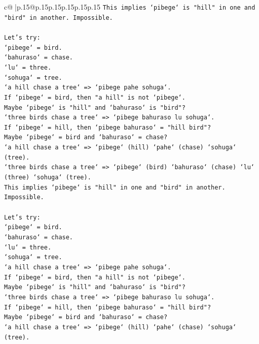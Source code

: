 \documentclass{article}
\begin{document}
{\begin{supertabular}{c@{$\;$}|p{.15\linewidth}@{}p{.15\linewidth}p{.15\linewidth}p{.15\linewidth}p{.15\linewidth}p{.15\linewidth}}
{{{\texttt{This implies `pibege` is "hill" in one and "bird" in another. Impossible.} \\
\\ 
\texttt{Let's try:} \\
\texttt{`pibege` = bird.} \\
\texttt{`bahuraso` = chase.} \\
\texttt{`lu` = three.} \\
\texttt{`sohuga` = tree.} \\
\texttt{`a hill chase a tree` => `pibege pahe sohuga`.} \\
\texttt{If `pibege` = bird, then "a hill" is not `pibege`.} \\
\texttt{Maybe `pibege` is "hill" and `bahuraso` is "bird"?} \\
\texttt{`three birds chase a tree` => `pibege bahuraso lu sohuga`.} \\
\texttt{If `pibege` = hill, then `pibege bahuraso` = "hill bird"?} \\
\texttt{Maybe `pibege` = bird and `bahuraso` = chase?} \\
\texttt{`a hill chase a tree` => `pibege` (hill) `pahe` (chase) `sohuga` (tree).} \\
\texttt{`three birds chase a tree` => `pibege` (bird) `bahuraso` (chase) `lu` (three) `sohuga` (tree).} \\
\texttt{This implies `pibege` is "hill" in one and "bird" in another. Impossible.} \\
\\ 
\texttt{Let's try:} \\
\texttt{`pibege` = bird.} \\
\texttt{`bahuraso` = chase.} \\
\texttt{`lu` = three.} \\
\texttt{`sohuga` = tree.} \\
\texttt{`a hill chase a tree` => `pibege pahe sohuga`.} \\
\texttt{If `pibege` = bird, then "a hill" is not `pibege`.} \\
\texttt{Maybe `pibege` is "hill" and `bahuraso` is "bird"?} \\
\texttt{`three birds chase a tree` => `pibege bahuraso lu sohuga`.} \\
\texttt{If `pibege` = hill, then `pibege bahuraso` = "hill bird"?} \\
\texttt{Maybe `pibege` = bird and `bahuraso` = chase?} \\
\texttt{`a hill chase a tree` => `pibege` (hill) `pahe` (chase) `sohuga` (tree).} \\
}}}
\end{supertabular}}
\end{document}
